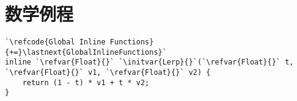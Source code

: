 \section{数学例程}\label{sec:数学例程}

\begin{lstlisting}
`\refcode{Global Inline Functions}{+=}\lastnext{GlobalInlineFunctions}`
inline `\refvar{Float}{}` `\initvar{Lerp}{}`(`\refvar{Float}{}` t, `\refvar{Float}{}` v1, `\refvar{Float}{}` v2) {
    return (1 - t) * v1 + t * v2;
}
\end{lstlisting}